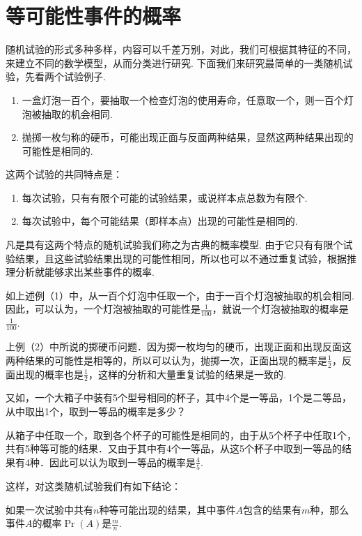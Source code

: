 \section{等可能性事件的概率}
随机试验的形式多种多样，内容可以千差万别，对此，我们可根据其特征的不同，来建立不同的数学模型，从而分类进行研究. 下面我们来研究最简单的一类随机试验，先看两个试验例子.
\begin{enumerate}[(1)]
\item 一盒灯泡一百个，要抽取一个检查灯泡的使用寿命，任意取一个，则一百个灯泡被抽取的机会相同.
\item 抛掷一枚匀称的硬币，可能出现正面与反面两种结果，显然这两种结果出现的可能性是相同的.
\end{enumerate}


这两个试验的共同特点是：
\begin{enumerate}[(1)]
\item 每次试验，只有有限个可能的试验结果，或说样本点总数为有限个.
\item 每次试验中，每个可能结果（即样本点）出现的可能性是相同的.
\end{enumerate}

凡是具有这两个特点的随机试验我们称之为古典的概率模型. 由于它只有有限个试验结果，且这些试验结果出现的可能性相同，所以也可以不通过重复试验，根据推理分析就能够求出某些事件的概率.

如上述例（1）中，从一百个灯泡中任取一个，由于一百个灯泡被抽取的机会相同.因此，可以认为，一个灯泡被抽取的可能性是$\frac{1}{100}$，就说一个灯泡被抽取的概率是$\frac{1}{100}$.

上例（2）中所说的掷硬币问题．因为掷一枚均匀的硬币，出现正面和出现反面这两种结果的可能性是相等的，所以可以认为，抛掷一次，正面出现的概率是$\frac{1}{2}$，反面出现的概率也是$\frac{1}{2}$，这样的分析和大量重复试验的结果是一致的.

又如，一个大箱子中装有5个型号相同的杯子，其中4个是一等品，1个是二等品，从中取出1个，取到一等品的概率是多少？

\begin{analyze}
    从箱子中任取一个，取到各个杯子的可能性是相同的，由于从5个杯子中任取1个，共有5种等可能的结果．又由于其中有4个一等品，从这5个杯子中取到一等品的结果有4种．因此可以认为取到一等品的概率是$\frac{4}{5}$.
\end{analyze}

这样，对这类随机试验我们有如下结论：

如果一次试验中共有$n$种等可能出现的结果，其中事件$A$包含的结果有$m$种，那么事件$A$的概率$\Pr(A)$是$\frac{m}{n}$.

